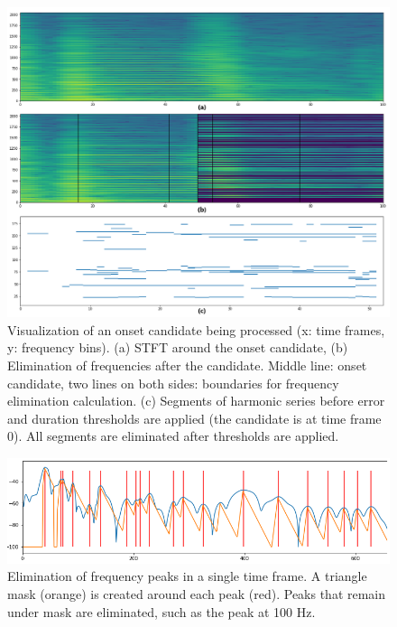 \begin{figure}
    \centering
    \includegraphics[width=\columnwidth]{methods/gs_0_642_noise.png}
    \caption{Visualization of an onset candidate being processed (x: time frames, y: frequency bins). (a) STFT around the onset candidate, (b) Elimination of frequencies after the candidate. Middle line: onset candidate, two lines on both sides: boundaries for frequency elimination calculation. (c) Segments of harmonic series before error and duration thresholds are applied (the candidate is at time frame 0). All segments are eliminated after thresholds are applied.}
    \label{fig:gs_0_noise}
\end{figure}

\begin{figure}
    \centering
    \includegraphics[width=\columnwidth]{methods/crude_masking_r.png}
    \caption{Elimination of frequency peaks in a single time frame. A triangle mask (orange) is created around each peak (red). Peaks that remain under mask are eliminated, such as the peak at 100 Hz.}
    \label{fig:crude_mask}
\end{figure}
